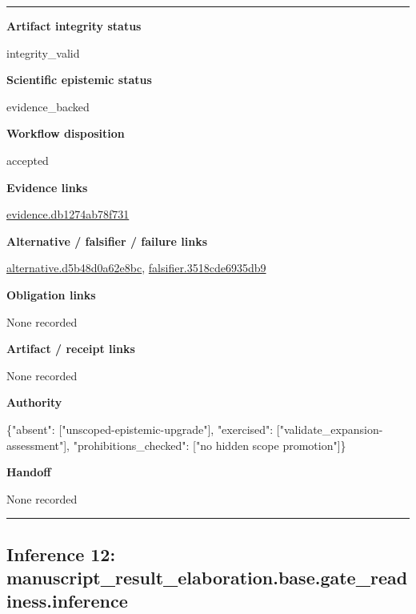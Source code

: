 \documentclass[10pt,a4paper]{article}
\newcommand{\TraceField}[2]{\par\noindent\textbf{#1}\par\noindent #2\par\smallskip}
\newenvironment{TraceDossier}{\par\medskip\noindent\hrule\medskip}{\medskip\hrule\par\medskip}
\begin{document}
\begin{TraceDossier}
\TraceField{Artifact integrity status}{integrity\_\allowbreak{}valid}

\TraceField{Scientific epistemic status}{evidence\_\allowbreak{}backed}

\TraceField{Workflow disposition}{accepted}

\TraceField{Evidence links}{\hyperlink{trace-evidence-d51db4cab6d8844d9a}{evidence.\allowbreak{}db1274ab78\allowbreak{}f731}}

\TraceField{Alternative / falsifier / failure links}{\hyperlink{trace-alternative-d4f64fd3f372877552}{alternativ\allowbreak{}e.\allowbreak{}d5b48d0a62\allowbreak{}e8bc}, \hyperlink{trace-alternative-45ceb3b3aff26806ff}{falsifier.\allowbreak{}3518cde693\allowbreak{}5db9}}

\TraceField{Obligation links}{None recorded}

\TraceField{Artifact / receipt links}{None recorded}

\TraceField{Authority}{\{"absent":\allowbreak{} ["unscoped\allowbreak{}-\allowbreak{}epistemic-\allowbreak{}upgrade"],\allowbreak{} "exercised\allowbreak{}":\allowbreak{} ["validate\allowbreak{}\_\allowbreak{}expansion-\allowbreak{}assessment\allowbreak{}"], "prohibiti\allowbreak{}ons\_\allowbreak{}checked":\allowbreak{} ["no hidden scope promotion"\allowbreak{}]\}}

\TraceField{Handoff}{None recorded}

\end{TraceDossier}
\pagebreak[2]\subsection{Inference 12: manuscript\allowbreak{}\_\allowbreak{}result\_\allowbreak{}elaboratio\allowbreak{}n.\allowbreak{}base.\allowbreak{}gate\_\allowbreak{}readiness.\allowbreak{}inference}\label{trace-inference-339c3d66dbd26bdd3d}
\end{document}
